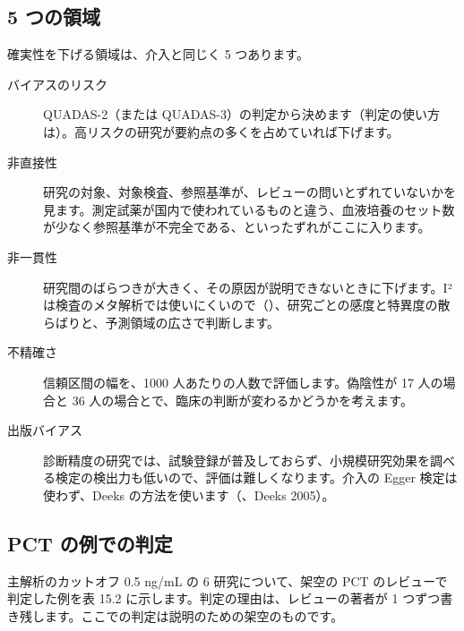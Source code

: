 \subsection{5 つの領域}
\label{sec:15-2-3}

確実性を下げる領域は、介入と同じく 5 つあります。

\begin{description}
\item[バイアスのリスク] QUADAS-2（または QUADAS-3）の判定から決めます（判定の使い方は）。高リスクの研究が要約点の多くを占めていれば下げます。
\item[非直接性] 研究の対象、対象検査、参照基準が、レビューの問いとずれていないかを見ます。測定試薬が国内で使われているものと違う、血液培養のセット数が少なく参照基準が不完全である、といったずれがここに入ります。
\item[非一貫性] 研究間のばらつきが大きく、その原因が説明できないときに下げます。I² は検査のメタ解析では使いにくいので（）、研究ごとの感度と特異度の散らばりと、予測領域の広さで判断します。
\item[不精確さ] 信頼区間の幅を、1000 人あたりの人数で評価します。偽陰性が 17 人の場合と 36 人の場合とで、臨床の判断が変わるかどうかを考えます。
\item[出版バイアス] 診断精度の研究では、試験登録が普及しておらず、小規模研究効果を調べる検定の検出力も低いので、評価は難しくなります。介入の Egger 検定は使わず、Deeks の方法を使います（、Deeks 2005）。
\end{description}

\subsection{PCT の例での判定}
\label{sec:15-2-4}

主解析のカットオフ 0.5 ng/mL の 6 研究について、架空の PCT のレビューで判定した例を表 15.2 に示します。判定の理由は、レビューの著者が 1 つずつ書き残します。ここでの判定は説明のための架空のものです。

\begin{kkcenter}
\end{kkcenter}

